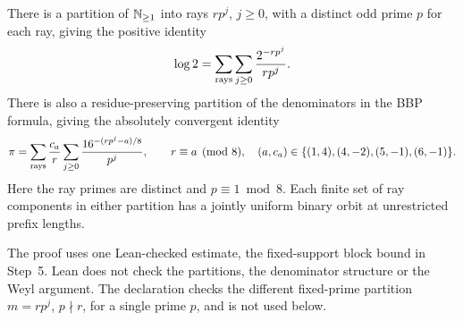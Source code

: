 \documentclass[11pt]{article}
\begin{document}
\begin{theorem}\label{th:rays}
There is a partition of $\mathbb N_{\ge1}$ into rays $rp^j$, $j\ge0$, with a distinct odd prime $p$ for each ray, giving the positive identity
\[
 \log 2=\sum_{\rm rays}\sum_{j\ge0}\frac{2^{-rp^j}}{rp^j}.
\]
There is also a residue-preserving partition of the denominators in the BBP formula, giving the absolutely convergent identity
\[
 \pi=\sum_{\rm rays}\frac{c_a}{r}\sum_{j\ge0}
            \frac{16^{-(rp^j-a)/8}}{p^j},
 \qquad r\equiv a\pmod8,\quad (a,c_a)\in\{(1,4),(4,-2),(5,-1),(6,-1)\}.
\]
Here the ray primes are distinct and $p\equiv1\bmod8$. Each finite set of ray components in either partition has a jointly uniform binary orbit at unrestricted prefix lengths.
\end{theorem}
The proof uses one Lean-checked estimate, the fixed-support block bound in Step~5. Lean does not check the partitions, the denominator structure or the Weyl argument. The declaration  checks the different fixed-prime partition $m=rp^j$, $p\nmid r$, for a single prime $p$, and is not used below.
\end{document}
